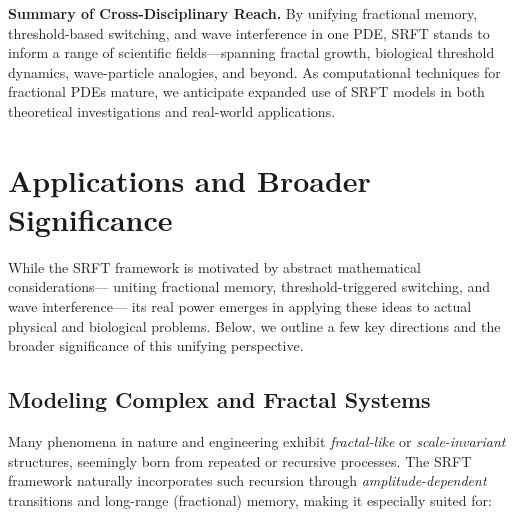 \documentclass[12pt]{article}
\begin{document}
\noindent
\textbf{Summary of Cross-Disciplinary Reach.} 
By unifying fractional memory, threshold-based switching, and wave interference in
one PDE, SRFT stands to inform a range of scientific fields—spanning fractal growth,
biological threshold dynamics, wave-particle analogies, and beyond. As computational
techniques for fractional PDEs mature, we anticipate expanded use of SRFT models in
both theoretical investigations and real-world applications.


\section{Applications and Broader Significance}
\label{sec:applications_significance}

While the SRFT framework is motivated by abstract mathematical considerations—%
uniting fractional memory, threshold-triggered switching, and wave interference—%
its real power emerges in applying these ideas to actual physical and biological
problems. Below, we outline a few key directions and the broader significance of
this unifying perspective.

\subsection{Modeling Complex and Fractal Systems}
\label{subsec:complex_fractal_systems}

Many phenomena in nature and engineering exhibit \emph{fractal-like} or
\emph{scale-invariant} structures, seemingly born from repeated or recursive
processes. The SRFT framework naturally incorporates such recursion through
\emph{amplitude-dependent} transitions and long-range (fractional) memory, making
it especially suited for:
\end{document}
